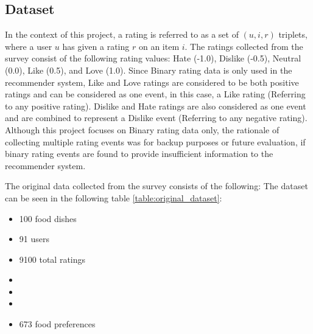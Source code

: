 \subsection{Dataset} \label{dataset}

In the context of this project, a rating is referred to as a set of $(u, i, r)$ triplets, where a user $u$ has given a rating $r$ on an item $i$. 
The ratings collected from the survey consist of the following rating values: Hate (-1.0), Dislike (-0.5), Neutral (0.0), Like (0.5), and Love (1.0). Since Binary rating data is only used in the recommender system, Like and Love ratings are considered to be both positive ratings and can be considered as one event, in this case, a Like rating (Referring to any positive rating). Dislike and Hate ratings are also considered as one event and are combined to represent a Dislike event (Referring to any negative rating). Although this project focuses on Binary rating data only, the rationale of collecting multiple rating events was for backup purposes or future evaluation, if binary rating events are found to provide insufficient information to the recommender system. 

The original data collected from the survey consists of the following:
The dataset can be seen in the following table \ref{table:original_dataset}:

\begin{itemize}
     \item{100 food dishes}
     \item{91 users}
     \item{9100 total ratings}
     \item{} 
     \item{}
     \item{}
     \item{673 food preferences}
\end{itemize}

